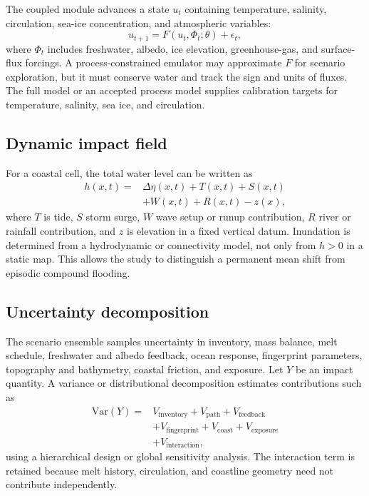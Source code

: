 \documentclass[conference]{IEEEtran}
\begin{document}
The coupled module advances a state $u_t$ containing temperature, salinity, circulation, sea-ice concentration, and atmospheric variables:
\begin{equation}
 u_{t+1}=F(u_t,\Phi_t;\theta)+\epsilon_t,
 \label{eq:earthsystem}
\end{equation}
where $\Phi_t$ includes freshwater, albedo, ice elevation, greenhouse-gas, and surface-flux forcings. A process-constrained emulator may approximate $F$ for scenario exploration, but it must conserve water and track the sign and units of fluxes. The full model or an accepted process model supplies calibration targets for temperature, salinity, sea ice, and circulation.

\subsection{Dynamic impact field}

For a coastal cell, the total water level can be written as
\begin{equation}
 \begin{aligned}
 h(x,t)={}&\Delta\eta(x,t)+T(x,t)+S(x,t)\\
          &+W(x,t)+R(x,t)-z(x),
 \end{aligned}
 \label{eq:coast}
\end{equation}
where $T$ is tide, $S$ storm surge, $W$ wave setup or runup contribution, $R$ river or rainfall contribution, and $z$ is elevation in a fixed vertical datum. Inundation is determined from a hydrodynamic or connectivity model, not only from $h>0$ in a static map. This allows the study to distinguish a permanent mean shift from episodic compound flooding.

\subsection{Uncertainty decomposition}

The scenario ensemble samples uncertainty in inventory, mass balance, melt schedule, freshwater and albedo feedback, ocean response, fingerprint parameters, topography and bathymetry, coastal friction, and exposure. Let $Y$ be an impact quantity. A variance or distributional decomposition estimates contributions such as
\begin{equation}
 \begin{aligned}
 \mathrm{Var}(Y)={}&V_{\mathrm{inventory}}+V_{\mathrm{path}}+V_{\mathrm{feedback}}\\
 &+V_{\mathrm{fingerprint}}+V_{\mathrm{coast}}+V_{\mathrm{exposure}}\\
 &+V_{\mathrm{interaction}},
 \end{aligned}
 \label{eq:variance}
\end{equation}
using a hierarchical design or global sensitivity analysis. The interaction term is retained because melt history, circulation, and coastline geometry need not contribute independently.
\end{document}
